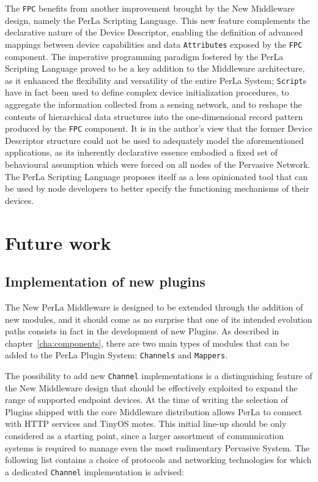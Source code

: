 The \texttt{FPC} benefits from another improvement brought by the New
Middleware design, namely the PerLa Scripting Language. This new feature
complements the declarative nature of the Device Descriptor, enabling the
definition of advanced mappings between device capabilities and data
\texttt{Attributes} exposed by the \texttt{FPC} component. The imperative
programming paradigm fostered by the PerLa Scripting Language proved to be a
key addition to the Middleware architecture, as it enhanced the flexibility and
versatility of the entire PerLa System; \texttt{Script}s have in fact been used
to define complex device initialization procedures, to aggregate the
information collected from a sensing network, and to reshape the contents of
hierarchical data structures into the one-dimensional record pattern produced
by the \texttt{FPC} component. It is in the author's view that the former
Device Descriptor structure could not be used to adequately model the
aforementioned applications, as its inherently declarative essence embodied a
fixed set of behavioural assumption which were forced on all nodes of the
Pervasive Network.  The PerLa Scripting Language proposes itself as a less
opinionated tool that can be used by node developers to better specify the
functioning mechanisms of their devices.


\section{Future work}

\subsection{Implementation of new plugins}

The New PerLa Middleware is designed to be extended through the addition of new
modules, and it should come as no surprise that one of its intended evolution
paths consists in fact in the development of new Plugins. As described in
chapter~\ref{cha:components}, there are two main types of modules that can be
added to the PerLa Plugin System: \texttt{Channels} and \texttt{Mappers}.

The possibility to add new \texttt{Channel} implementations is a distinguishing
feature of the New Middleware design that should be effectively exploited to
expand the range of supported endpoint devices. At the time of writing the
selection of Plugins shipped with the core Middleware distribution allows PerLa
to connect with HTTP services and TinyOS motes. This initial line-up should be
only considered as a starting point, since a larger assortment of communication
systems is required to manage even the most rudimentary Pervasive System. The
following list contains a choice of protocols and networking technologies for
which a dedicated \texttt{Channel} implementation is advised:

